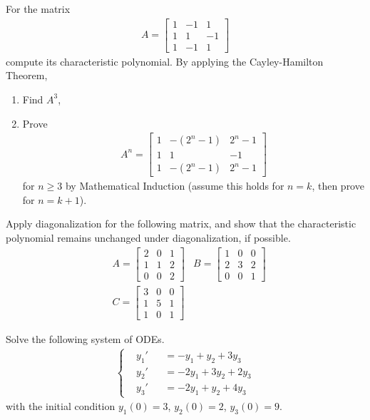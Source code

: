 \begin{Exercise}
For the matrix 
\begin{align*}
A = 
\begin{bmatrix}
1 & -1 & 1\\
1 & 1 & -1\\
1 & -1 & 1
\end{bmatrix}
\end{align*}
compute its characteristic polynomial. By applying the Cayley-Hamilton Theorem,
\begin{enumerate}[label=(\alph*)]
\item Find $A^{3}$,
\item Prove 
\begin{align*}
A^{n} = \begin{bmatrix}
1 & -(2^n-1) & 2^n-1\\
1 & 1 & -1\\
1 & -(2^n-1) & 2^n-1
\end{bmatrix}
\end{align*}
for $n \geq 3$ by Mathematical Induction (assume this holds for $n = k$, then prove for $n = k+1$).
\end{enumerate}
\end{Exercise}

\begin{Exercise}
Apply diagonalization for the following matrix, and show that the characteristic polynomial remains unchanged under diagonalization, if possible.
\begin{align*}
&A =
\begin{bmatrix}
2 & 0 & 1\\
1 & 1 & 2\\
0 & 0 & 2
\end{bmatrix} 
&B =
\begin{bmatrix}
1 & 0 & 0\\
2 & 3 & 2\\
0 & 0 & 1
\end{bmatrix} \\
&C = 
\begin{bmatrix}
3 & 0 & 0\\
1 & 5 & 1\\
1 & 0 & 1
\end{bmatrix} 
\end{align*}
\end{Exercise}

\begin{Exercise}
Solve the following system of ODEs.
\begin{align*}
\left\{\begin{alignedat}{2}
&y_1'& &= -y_1 + y_2 + 3y_3\\
&y_2'& &= -2y_1 + 3y_2 + 2y_3\\
&y_3'& &= -2y_1 + y_2 + 4y_3
\end{alignedat}\right.
\end{align*}
with the initial condition $y_1(0) = 3$, $y_2(0) = 2$, $y_3(0) = 9$.
\end{Exercise}

